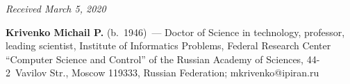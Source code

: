 \vspace*{-9pt}

\hfill{\small\textit{Received March 5, 2020}}




\Contrl

\noindent
\textbf{Krivenko Michail P.} (b.\ 1946)~--- Doctor of Science in technology, 
professor, leading scientist, Institute of Informatics Problems, Federal Research 
Center ``Computer Science and Control'' of the Russian Academy of Sciences, 
\mbox{44-2}~Vavilov Str., Moscow 119333, Russian Federation; \mbox{mkrivenko@ipiran.ru}

\label{end\stat}

\renewcommand{\bibname}{\protect\rm Литература} 